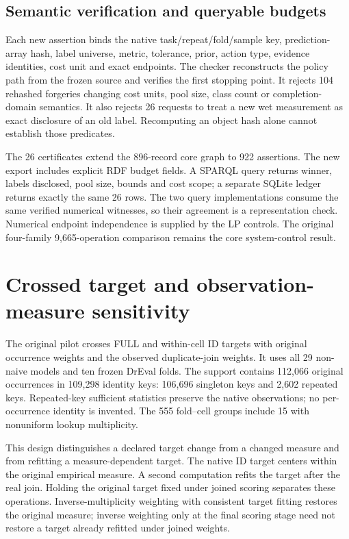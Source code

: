 

\FloatBarrier
\subsection{Semantic verification and queryable budgets}
Each new assertion binds the native task/repeat/fold/sample key, prediction-array hash, label universe, metric, tolerance, prior, action type, evidence identities, cost unit and exact endpoints. The checker reconstructs the policy path from the frozen source and verifies the first stopping point. It rejects 104 rehashed forgeries changing cost units, pool size, class count or completion-domain semantics. It also rejects 26 requests to treat a new wet measurement as exact disclosure of an old label. Recomputing an object hash alone cannot establish those predicates.

The 26 certificates extend the 896-record core graph to 922 assertions. The new export includes explicit RDF budget fields. A SPARQL query returns winner, labels disclosed, pool size, bounds and cost scope; a separate SQLite ledger returns exactly the same 26 rows. The two query implementations consume the same verified numerical witnesses, so their agreement is a representation check. Numerical endpoint independence is supplied by the LP controls. The original four-family 9,665-operation comparison remains the core system-control result.

\FloatBarrier
\section{Crossed target and observation-measure sensitivity}\label{sec:suptargetmeasure}
The original pilot crosses FULL and within-cell ID targets with original occurrence weights and the observed duplicate-join weights. It uses all 29 non-naive models and ten frozen DrEval folds. The support contains 112,066 original occurrences in 109,298 identity keys: 106,696 singleton keys and 2,602 repeated keys. Repeated-key sufficient statistics preserve the native observations; no per-occurrence identity is invented. The 555 fold--cell groups include 15 with nonuniform lookup multiplicity.

This design distinguishes a declared target change from a changed measure and from refitting a measure-dependent target. The native ID target centers within the original empirical measure. A second computation refits the target after the real join. Holding the original target fixed under joined scoring separates these operations. Inverse-multiplicity weighting with consistent target fitting restores the original measure; inverse weighting only at the final scoring stage need not restore a target already refitted under joined weights.


